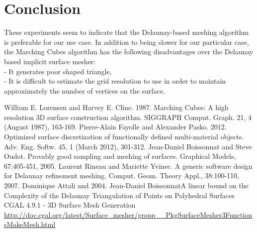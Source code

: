 \documentclass{article}
\begin{document}
\section*{Conclusion}
These experiments seem to indicate that the Delaunay-based meshing algorithm is preferable for our use case.
In addition to being slower for our particular case, the Marching Cubes algorithm has the following disadvantages over the Delaunay based implicit surface mesher:\\
- It generates poor shaped triangle,\\
- It is difficult to estimate the grid resolution to use in order to maintain approximately the number of vertices on the surface.


 \begin{thebibliography}{9}
 William E. Lorensen and Harvey E. Cline. 1987. Marching Cubes: A high resolution 3D surface construction algorithm. SIGGRAPH Comput. Graph. 21, 4 (August 1987), 163-169.
 Pierre-Alain Fayolle and Alexander Pasko. 2012. Optimized surface discretization of functionally defined multi-material objects. Adv. Eng. Softw. 45, 1 (March 2012), 301-312.
Jean-Daniel Boissonnat and Steve Oudot. Provably good sampling and meshing of surfaces. Graphical Models, 67:405-451, 2005.
Laurent Rineau and Mariette Yvinec. A generic software design for Delaunay refinement meshing. Comput. Geom. Theory Appl., 38:100-110, 2007.
 Dominique Attali and 2004. Jean-Daniel BoissonnatA linear bound on the Complexity of the Delaunay Triangulation of Points on Polyhedral Surfaces
CGAL 4.9.1 - 3D Surface Mesh Generation \\
\url{http://doc.cgal.org/latest/Surface_mesher/group__PkgSurfaceMesher3FunctionsMakeMesh.html}


\end{thebibliography}
\end{document}
